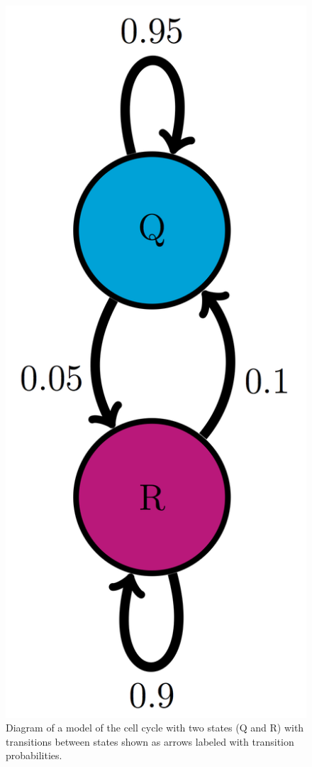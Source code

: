 \documentclass[
]{book}
\theoremstyle{definition}
\theoremstyle{definition}
\theoremstyle{definition}
\theoremstyle{remark}
\begin{document}
\begin{figure}
\centering
\includegraphics{ch10/QR_trans_diag.png}
\caption{Diagram of a model of the cell cycle with two states (Q and R) with transitions between states shown as arrows labeled with transition probabilities.}
\end{figure}
\end{document}
